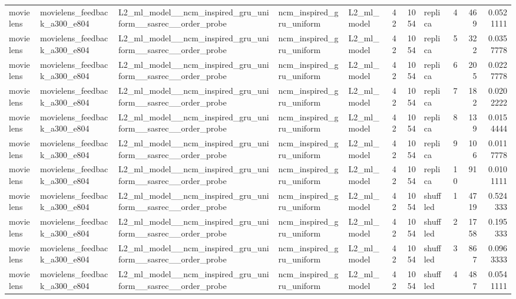 \begin{table}[htbp!]
\begin{tabular}{lllllrrlrrr}
movielens & movielens\_feedback\_a300\_e804 & L2\_ml\_model\_\_ncm\_inspired\_gru\_uniform\_\_sasrec\_\_order\_probe & ncm\_inspired\_gru\_uniform & L2\_ml\_model & 42 & 1054 & replica & 4 & 469 & 0.0521111 \\
movielens & movielens\_feedback\_a300\_e804 & L2\_ml\_model\_\_ncm\_inspired\_gru\_uniform\_\_sasrec\_\_order\_probe & ncm\_inspired\_gru\_uniform & L2\_ml\_model & 42 & 1054 & replica & 5 & 322 & 0.0357778 \\
movielens & movielens\_feedback\_a300\_e804 & L2\_ml\_model\_\_ncm\_inspired\_gru\_uniform\_\_sasrec\_\_order\_probe & ncm\_inspired\_gru\_uniform & L2\_ml\_model & 42 & 1054 & replica & 6 & 205 & 0.0227778 \\
movielens & movielens\_feedback\_a300\_e804 & L2\_ml\_model\_\_ncm\_inspired\_gru\_uniform\_\_sasrec\_\_order\_probe & ncm\_inspired\_gru\_uniform & L2\_ml\_model & 42 & 1054 & replica & 7 & 182 & 0.0202222 \\
movielens & movielens\_feedback\_a300\_e804 & L2\_ml\_model\_\_ncm\_inspired\_gru\_uniform\_\_sasrec\_\_order\_probe & ncm\_inspired\_gru\_uniform & L2\_ml\_model & 42 & 1054 & replica & 8 & 139 & 0.0154444 \\
movielens & movielens\_feedback\_a300\_e804 & L2\_ml\_model\_\_ncm\_inspired\_gru\_uniform\_\_sasrec\_\_order\_probe & ncm\_inspired\_gru\_uniform & L2\_ml\_model & 42 & 1054 & replica & 9 & 106 & 0.0117778 \\
movielens & movielens\_feedback\_a300\_e804 & L2\_ml\_model\_\_ncm\_inspired\_gru\_uniform\_\_sasrec\_\_order\_probe & ncm\_inspired\_gru\_uniform & L2\_ml\_model & 42 & 1054 & replica & 10 & 91 & 0.0101111 \\
movielens & movielens\_feedback\_a300\_e804 & L2\_ml\_model\_\_ncm\_inspired\_gru\_uniform\_\_sasrec\_\_order\_probe & ncm\_inspired\_gru\_uniform & L2\_ml\_model & 42 & 1054 & shuffled & 1 & 4719 & 0.524333 \\
movielens & movielens\_feedback\_a300\_e804 & L2\_ml\_model\_\_ncm\_inspired\_gru\_uniform\_\_sasrec\_\_order\_probe & ncm\_inspired\_gru\_uniform & L2\_ml\_model & 42 & 1054 & shuffled & 2 & 1758 & 0.195333 \\
movielens & movielens\_feedback\_a300\_e804 & L2\_ml\_model\_\_ncm\_inspired\_gru\_uniform\_\_sasrec\_\_order\_probe & ncm\_inspired\_gru\_uniform & L2\_ml\_model & 42 & 1054 & shuffled & 3 & 867 & 0.0963333 \\
movielens & movielens\_feedback\_a300\_e804 & L2\_ml\_model\_\_ncm\_inspired\_gru\_uniform\_\_sasrec\_\_order\_probe & ncm\_inspired\_gru\_uniform & L2\_ml\_model & 42 & 1054 & shuffled & 4 & 487 & 0.0541111 \\

\end{tabular}
\end{table}
